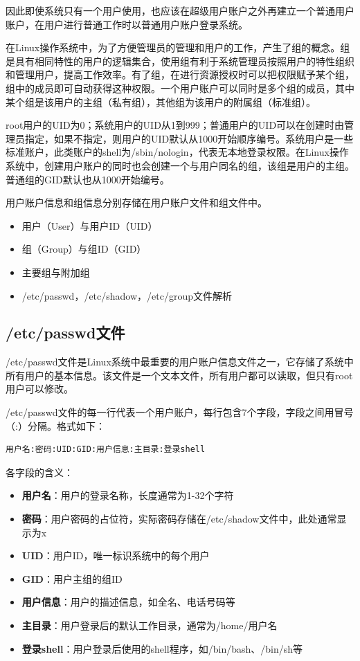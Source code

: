 \documentclass[12pt,UTF8]{ctexbook}
\begin{document}
因此即使系统只有一个用户使用，也应该在超级用户账户之外再建立一个普通用户账户，在用户进行普通工作时以普通用户账户登录系统。

在Linux操作系统中，为了方便管理员的管理和用户的工作，产生了组的概念。组是具有相同特性的用户的逻辑集合，使用组有利于系统管理员按照用户的特性组织和管理用户，提高工作效率。有了组，在进行资源授权时可以把权限赋予某个组，组中的成员即可自动获得这种权限。一个用户账户可以同时是多个组的成员，其中某个组是该用户的主组（私有组），其他组为该用户的附属组（标准组）。

root用户的UID为0；系统用户的UID从1到999；普通用户的UID可以在创建时由管理员指定，如果不指定，则用户的UID默认从1000开始顺序编号。系统用户是一些标准账户，此类账户的shell为/sbin/nologin，代表无本地登录权限。在Linux操作系统中，创建用户账户的同时也会创建一个与用户同名的组，该组是用户的主组。普通组的GID默认也从1000开始编号。

用户账户信息和组信息分别存储在用户账户文件和组文件中。

\begin{itemize}
    \item 用户（User）与用户ID（UID）
    \item 组（Group）与组ID（GID）
    \item 主要组与附加组
    \item /etc/passwd，/etc/shadow，/etc/group文件解析
\end{itemize}

\subsection{/etc/passwd文件}

/etc/passwd文件是Linux系统中最重要的用户账户信息文件之一，它存储了系统中所有用户的基本信息。该文件是一个文本文件，所有用户都可以读取，但只有root用户可以修改。

/etc/passwd文件的每一行代表一个用户账户，每行包含7个字段，字段之间用冒号（:）分隔。格式如下：

\begin{verbatim}
用户名:密码:UID:GID:用户信息:主目录:登录shell
\end{verbatim}

各字段的含义：

\begin{itemize}
    \item \textbf{用户名}：用户的登录名称，长度通常为1-32个字符
    \item \textbf{密码}：用户密码的占位符，实际密码存储在/etc/shadow文件中，此处通常显示为x
    \item \textbf{UID}：用户ID，唯一标识系统中的每个用户
    \item \textbf{GID}：用户主组的组ID
    \item \textbf{用户信息}：用户的描述信息，如全名、电话号码等
    \item \textbf{主目录}：用户登录后的默认工作目录，通常为/home/用户名
    \item \textbf{登录shell}：用户登录后使用的shell程序，如/bin/bash、/bin/sh等
\end{itemize}
\end{document}
